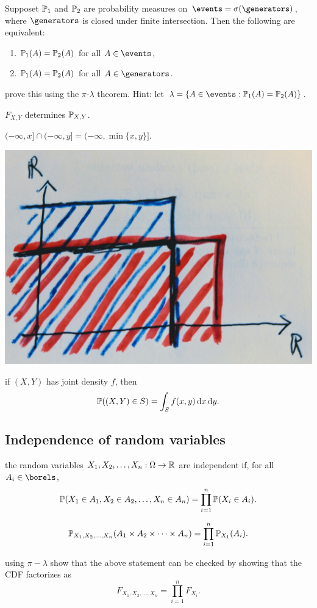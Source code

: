 \documentclass{article}
\begin{document}
 Supposet $\P_1$ and $\P_2$ are probability measures on $\events = \sigma(\generators)$, where $\generators$ is closed under finite intersection. Then the following are equivalent:
\begin{enumerate}
  \item $\P_1(A) = \P_2(A)$ for all $A \in \events$,
  \item $\P_1(A) = \P_2(A)$ for all $A \in \generators$.
\end{enumerate}

 prove this using the $\pi$-$\lambda$ theorem. Hint: let $\lambda = \{A \in \events : \P_1(A) = \P_2(A)\}$.

 $F_{X,Y}$ determines $\P_{X,Y}$.

 $(-\infty, x] \cap (-\infty, y] = (-\infty, \min\{x, y\}]$.
\begin{center}
	\includegraphics[width=0.5\linewidth]{figures/intersection}
\end{center}

 if $(X,Y)$ has joint density $f$, then
\[ \P((X, Y) \in S) = \int_S f(x,y) \ud x \ud y. \]


\subsection{Independence of random variables}


 the random variables $X_1, X_2, \dots, X_n : \Omega \to \R$ are independent if, for all $A_i \in \borels$, \[ \P(X_1 \in A_1, X_2 \in A_2, \dots, X_n \in A_n) = \prod_{i=1}^n \P(X_i \in A_i). \]

 \[ \P_{X_1, X_2, \dots, X_n}(A_1 \times A_2 \times \dots \times A_n) = \prod_{i=1}^n \P_{X_1}(A_i). \]

 using $\pi-\lambda$ show that the above statement can be checked by showing that the CDF factorizes as 
\[ F_{X_1, X_2, \dots, X_n} = \prod_{i=1}^n F_{X_i}. \]
\end{document}
